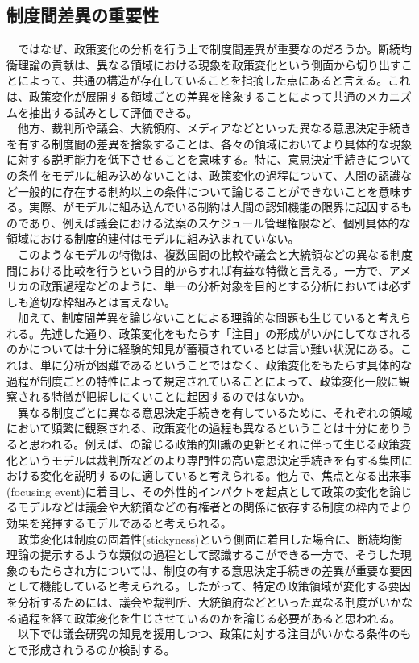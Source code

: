 \subsection{制度間差異の重要性}
　ではなぜ、政策変化の分析を行う上で制度間差異が重要なのだろうか。断続均衡理論の貢献は、異なる領域における現象を政策変化という側面から切り出すことによって、共通の構造が存在していることを指摘した点にあると言える。これは、政策変化が展開する領域ごとの差異を捨象することによって共通のメカニズムを抽出する試みとして評価できる。\\
　他方、裁判所や議会、大統領府、メディアなどといった異なる意思決定手続きを有する制度間の差異を捨象することは、各々の領域においてより具体的な現象に対する説明能力を低下させることを意味する。特に、意思決定手続きについての条件をモデルに組み込めないことは、政策変化の過程について、人間の認識など一般的に存在する制約以上の条件について論じることができないことを意味する。実際、\citep*{Baumgartner2010-rl}がモデルに組み込んでいる制約は人間の認知機能の限界に起因するものであり、例えば議会における法案のスケジュール管理権限など、個別具体的な領域における制度的建付はモデルに組み込まれていない。\\
　このようなモデルの特徴は、複数国間の比較や議会と大統領などの異なる制度間における比較を行うという目的からすれば有益な特徴と言える。一方で、アメリカの政策過程などのように、単一の分析対象を目的とする分析においては必ずしも適切な枠組みとは言えない。\\
　加えて、制度間差異を論じないことによる理論的な問題も生じていると考えられる。先述した通り、政策変化をもたらす「注目」の形成がいかにしてなされるのかについては十分に経験的知見が蓄積されているとは言い難い状況にある。これは、単に分析が困難であるということではなく、政策変化をもたらす具体的な過程が制度ごとの特性によって規定されていることによって、政策変化一般に観察される特徴が把握しにくいことに起因するのではないか。\\
　異なる制度ごとに異なる意思決定手続きを有しているために、それぞれの領域において頻繁に観察される、政策変化の過程も異なるということは十分にありうると思われる。例えば、\citet*{Baumgartner1993-bc, Baumgartner2010-rl}の論じる政策的知識の更新とそれに伴って生じる政策変化というモデルは裁判所などのより専門性の高い意思決定手続きを有する集団における変化を説明するのに適していると考えられる。他方で、焦点となる出来事(focusing event)に着目し、その外性的インパクトを起点として政策の変化を論じるモデル\citep*{Birkland1997-lq, Birkland1998-xp,Sabatier1993-id,Bertelli2013-zq}などは議会や大統領などの有権者との関係に依存する制度の枠内でより効果を発揮するモデルであると考えられる。\\
　政策変化は制度の固着性(stickyness)という側面に着目した場合に、断続均衡理論の提示するような類似の過程として認識するこができる一方で、そうした現象のもたらされ方については、制度の有する意思決定手続きの差異が重要な要因として機能していると考えられる。したがって、特定の政策領域が変化する要因を分析するためには、議会や裁判所、大統領府などといった異なる制度がいかなる過程を経て政策変化を生じさせているのかを論じる必要があると思われる。\\
　以下では議会研究の知見を援用しつつ、政策に対する注目がいかなる条件のもとで形成されうるのか検討する。\\

